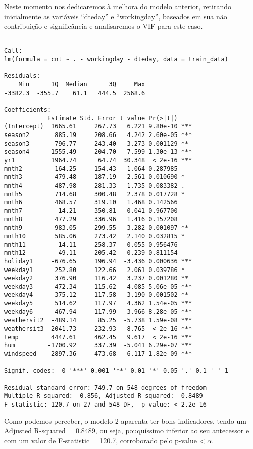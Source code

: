 \documentclass[
  letterpaper,
  DIV=11,
  numbers=noendperiod]{scrartcl}
\begin{document}
Neste momento nos dedicaremos à melhora do modelo anterior, retirando
inicialmente as variáveis ``dteday'' e ``workingday'', baseados em sua
não contribuição e significância e analisaremos o VIF para este caso.

\begin{verbatim}

Call:
lm(formula = cnt ~ . - workingday - dteday, data = train_data)

Residuals:
    Min      1Q  Median      3Q     Max 
-3382.3  -355.7    61.1   444.5  2568.6 

Coefficients:
            Estimate Std. Error t value Pr(>|t|)    
(Intercept)  1665.61     267.73   6.221 9.80e-10 ***
season2       885.19     208.66   4.242 2.60e-05 ***
season3       796.77     243.40   3.273 0.001129 ** 
season4      1555.49     204.70   7.599 1.30e-13 ***
yr1          1964.74      64.74  30.348  < 2e-16 ***
mnth2         164.25     154.43   1.064 0.287985    
mnth3         479.48     187.19   2.561 0.010690 *  
mnth4         487.98     281.33   1.735 0.083382 .  
mnth5         714.68     300.48   2.378 0.017728 *  
mnth6         468.57     319.10   1.468 0.142566    
mnth7          14.21     350.81   0.041 0.967700    
mnth8         477.29     336.96   1.416 0.157208    
mnth9         983.05     299.55   3.282 0.001097 ** 
mnth10        585.06     273.42   2.140 0.032815 *  
mnth11        -14.11     258.37  -0.055 0.956476    
mnth12        -49.11     205.42  -0.239 0.811154    
holiday1     -676.65     196.94  -3.436 0.000636 ***
weekday1      252.80     122.66   2.061 0.039786 *  
weekday2      376.90     116.42   3.237 0.001280 ** 
weekday3      472.34     115.62   4.085 5.06e-05 ***
weekday4      375.12     117.58   3.190 0.001502 ** 
weekday5      514.62     117.97   4.362 1.54e-05 ***
weekday6      467.94     117.99   3.966 8.28e-05 ***
weathersit2  -489.14      85.25  -5.738 1.59e-08 ***
weathersit3 -2041.73     232.93  -8.765  < 2e-16 ***
temp         4447.61     462.45   9.617  < 2e-16 ***
hum         -1700.92     337.39  -5.041 6.29e-07 ***
windspeed   -2897.36     473.68  -6.117 1.82e-09 ***
---
Signif. codes:  0 '***' 0.001 '**' 0.01 '*' 0.05 '.' 0.1 ' ' 1

Residual standard error: 749.7 on 548 degrees of freedom
Multiple R-squared:  0.856, Adjusted R-squared:  0.8489 
F-statistic: 120.7 on 27 and 548 DF,  p-value: < 2.2e-16
\end{verbatim}

Como podemos perceber, o modelo 2 aparenta ter bons indicadores, tendo
um Adjusted R-squared = 0.8489, ou seja, pouquíssimo inferior ao seu
antecessor e com um valor de F-statistic = 120.7, corroborado pelo
p-value \textless{} \(\alpha\).
\end{document}
